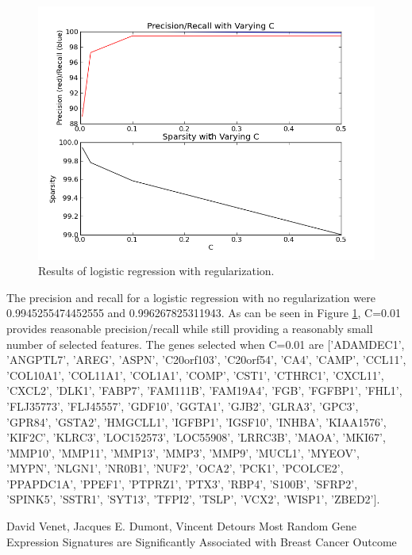 \documentclass[11pt]{article}
\begin{document}
\begin{figure}[h!]
  \centering
    \includegraphics[scale=0.5]{sparselog.png}
  \caption{Results of logistic regression with regularization.}
\label{fig:sparselog}
\end{figure}
The precision and recall for a logistic regression with no regularization were 0.9945255474452555 and 0.996267825311943. As can be seen in Figure \ref{fig:sparselog}, C=0.01 provides reasonable precision/recall while still providing a reasonably small number of selected features. The genes selected when C=0.01 are $[$'ADAMDEC1', 'ANGPTL7', 'AREG', 'ASPN', 'C20orf103', 'C20orf54', 'CA4', 'CAMP', 'CCL11', 'COL10A1', 'COL11A1', 'COL1A1', 'COMP', 'CST1', 'CTHRC1', 'CXCL11', 'CXCL2', 'DLK1', 'FABP7', 'FAM111B', 'FAM19A4', 'FGB', 'FGFBP1', 'FHL1', 'FLJ35773', 'FLJ45557', 'GDF10', 'GGTA1', 'GJB2', 'GLRA3', 'GPC3', 'GPR84', 'GSTA2', 'HMGCLL1', 'IGFBP1', 'IGSF10', 'INHBA', 'KIAA1576', 'KIF2C', 'KLRC3', 'LOC152573', 'LOC55908', 'LRRC3B', 'MAOA', 'MKI67', 'MMP10', 'MMP11', 'MMP13', 'MMP3', 'MMP9', 'MUCL1', 'MYEOV', 'MYPN', 'NLGN1', 'NR0B1', 'NUF2', 'OCA2', 'PCK1', 'PCOLCE2', 'PPAPDC1A', 'PPEF1', 'PTPRZ1', 'PTX3', 'RBP4', 'S100B', 'SFRP2', 'SPINK5', 'SSTR1', 'SYT13', 'TFPI2', 'TSLP', 'VCX2', 'WISP1', 'ZBED2'$]$.
\begin{thebibliography}{9}

  David Venet, Jacques E. Dumont, Vincent Detours
  Most Random Gene Expression Signatures are Significantly Associated with Breast Cancer Outcome
\end{thebibliography}
\end{document}
